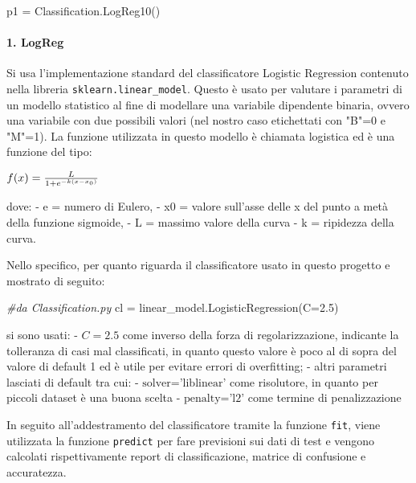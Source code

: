 \documentclass[11pt]{article}
\newenvironment{Shaded}{}{}
\newcommand{\FloatTok}[1]{\textcolor[rgb]{0.25,0.63,0.44}{{#1}}}
\newcommand{\CommentTok}[1]{\textcolor[rgb]{0.38,0.63,0.69}{\textit{{#1}}}}
\newcommand{\NormalTok}[1]{{#1}}
\newcommand{\OperatorTok}[1]{\textcolor[rgb]{0.40,0.40,0.40}{{#1}}}
\begin{document}
\begin{Shaded}
\begin{Highlighting}[]
\NormalTok{p1 }\OperatorTok{=}\NormalTok{ Classification.LogReg10()}
\end{Highlighting}
\end{Shaded}

    \paragraph{1. LogReg}\label{logreg}

    Si usa l'implementazione standard del classificatore Logistic Regression
contenuto nella libreria \texttt{sklearn.linear\_model}. Questo è usato
per valutare i parametri di un modello statistico al fine di modellare
una variabile dipendente binaria, ovvero una variabile con due possibili
valori (nel nostro caso etichettati con "B"=0 e "M"=1). La funzione
utilizzata in questo modello è chiamata logistica ed è una funzione del
tipo:

\(\begin{equation*} f(x)={\frac {L}{1+e^{-k(x-x_{0})}}}\\ \end{equation*}\)

dove: - e = numero di Eulero, - x0 = valore sull'asse delle x del punto
a metà della funzione sigmoide, - L = massimo valore della curva - k =
ripidezza della curva.

Nello specifico, per quanto riguarda il classificatore usato in questo
progetto e mostrato di seguito:

\begin{Shaded}
\begin{Highlighting}[]
\CommentTok{#da Classification.py}
\NormalTok{cl }\OperatorTok{=}\NormalTok{ linear_model.LogisticRegression(C}\OperatorTok{=}\FloatTok{2.5}\NormalTok{)}
\end{Highlighting}
\end{Shaded}

si sono usati: - \(C=2.5\) come inverso della forza di regolarizzazione,
indicante la tolleranza di casi mal classificati, in quanto questo
valore è poco al di sopra del valore di default 1 ed è utile per evitare
errori di overfitting; - altri parametri lasciati di default tra cui: -
\(\text{solver='liblinear'}\) come risolutore, in quanto per piccoli
dataset è una buona scelta - \(\text{penalty='l2'}\) come termine di
penalizzazione

In seguito all'addestramento del classificatore tramite la funzione
\texttt{fit}, viene utilizzata la funzione \texttt{predict} per fare
previsioni sui dati di test e vengono calcolati rispettivamente report
di classificazione, matrice di confusione e accuratezza.
\end{document}
